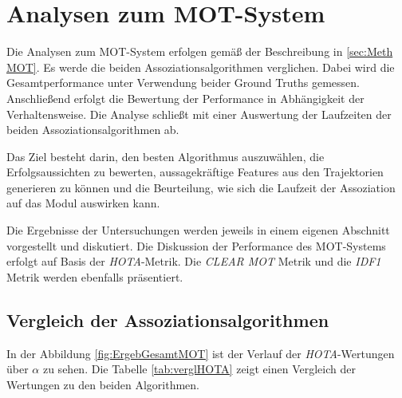 \section{Analysen zum MOT-System}\label{sec:Ergebnisse MOT}
Die Analysen zum MOT-System erfolgen gemäß der Beschreibung in \autoref{sec:Meth MOT}. Es werde die beiden Assoziationsalgorithmen verglichen. Dabei wird die Gesamtperformance unter Verwendung beider Ground Truths gemessen. Anschließend erfolgt die Bewertung der Performance in Abhängigkeit der Verhaltensweise. Die Analyse schließt mit einer Auswertung der Laufzeiten der beiden Assoziationsalgorithmen ab. \par

Das Ziel besteht darin, den besten Algorithmus auszuwählen, die Erfolgsaussichten zu bewerten, aussagekräftige Features aus den Trajektorien generieren zu können und die Beurteilung, wie sich die Laufzeit der Assoziation auf das Modul auswirken kann. \par

Die Ergebnisse der Untersuchungen werden jeweils in einem eigenen Abschnitt vorgestellt und diskutiert. Die Diskussion der Performance des MOT-Systems erfolgt auf Basis der \textit{HOTA}-Metrik. Die \textit{CLEAR MOT} Metrik und die \textit{IDF1} Metrik werden ebenfalls präsentiert. 


\subsection{Vergleich der Assoziationsalgorithmen}

In der Abbildung \ref{fig:ErgebGesamtMOT} ist der Verlauf der \textit{HOTA}-Wertungen über \(\alpha\) zu sehen. Die Tabelle \ref{tab:verglHOTA} zeigt einen Vergleich der Wertungen zu den beiden Algorithmen.

